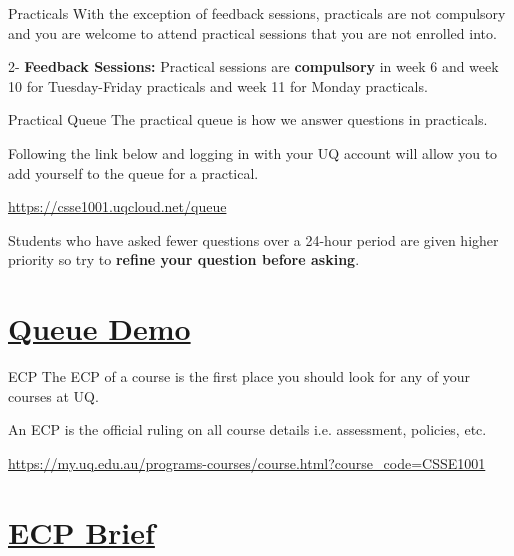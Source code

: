 \documentclass[week3]{csse1001}
\begin{document}
\begin{topic}{Practicals}
With the exception of feedback sessions, practicals are not compulsory and you are welcome to attend practical sessions that you are not enrolled into.

\begin{subtopic}{2-}
\textbf{Feedback Sessions:} Practical sessions are \textbf{compulsory} in week 6 and week 10 for Tuesday-Friday practicals and week 11 for Monday practicals.
\end{subtopic}
\end{topic}

\begin{topic}{Practical Queue}
The practical queue is how we answer questions in practicals.

Following the link below and logging in with your UQ account will allow you to add yourself to the queue for a practical.

\url{https://csse1001.uqcloud.net/queue}

Students who have asked fewer questions over a 24-hour period are given higher priority so try to \textbf{refine your question before asking}.
\end{topic}

\section{\href{https://csse1001.uqcloud.net/queue}{Queue Demo}}

\begin{topic}{ECP}
The ECP of a course is the first place you should look for any of your courses at UQ.

An ECP is the official ruling on all course details i.e. assessment, policies, etc.

\url{https://my.uq.edu.au/programs-courses/course.html?course_code=CSSE1001}
\end{topic}

\section{\href{https://my.uq.edu.au/programs-courses/course.html?course_code=CSSE1001}{ECP Brief}}
\end{document}
